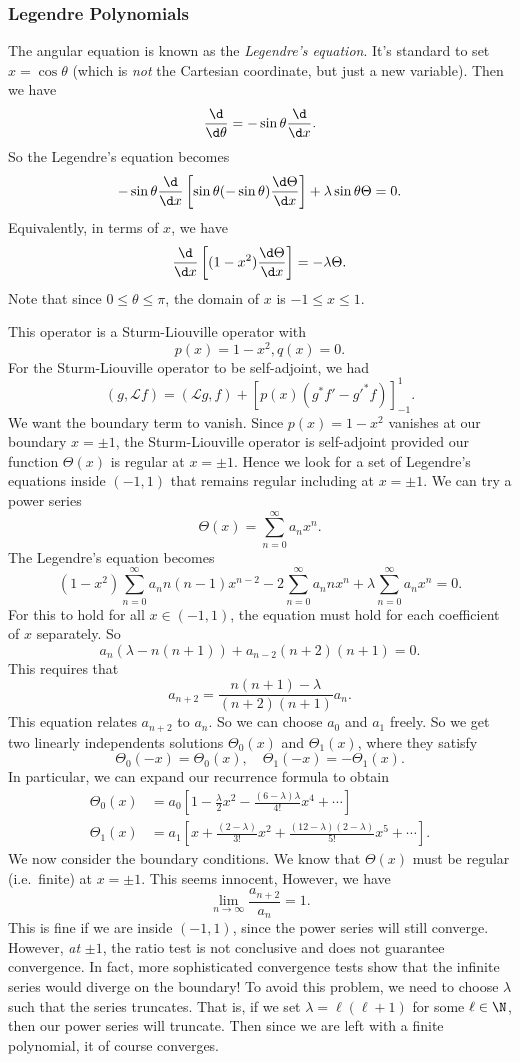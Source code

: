 \documentclass[a4paper]{article}
\begin{document}
\subsubsection{Legendre Polynomials}
The angular equation is known as the \emph{Legendre's equation}. It's standard to set $x = \cos \theta$ (which is \emph{not} the Cartesian coordinate, but just a new variable). Then we have
\[
  \frac{\d}{\d \theta} = -\sin \theta \frac{\d}{\d x}.
\]
So the Legendre's equation becomes
\[
  -\sin \theta \frac{\d}{\d x}\left[\sin \theta (-\sin \theta) \frac{\d \Theta}{\d x}\right]+ \lambda \sin \theta \Theta = 0.
\]
Equivalently, in terms of $x$, we have
\[
  \frac{\d}{\d x}\left[(1 - x^2) \frac{\d \Theta}{\d x}\right] = -\lambda \Theta.
\]
Note that since $0 \leq \theta \leq \pi$, the domain of $x$ is $-1 \leq x \leq 1$.

This operator is a Sturm-Liouville operator with
\[
  p(x) = 1 - x^2, q(x) = 0.
\]
For the Sturm-Liouville operator to be self-adjoint, we had
\[
  (g, \mathcal{L} f) = (\mathcal{L}g, f) + [p(x) (g^* f' - g'^* f)]^{1}_{-1}.
\]
We want the boundary term to vanish. Since $p(x) = 1- x^2$ vanishes at our boundary $x = \pm 1$, the Sturm-Liouville operator is self-adjoint provided our function $\Theta(x)$ is regular at $x = \pm 1$. Hence we look for a set of Legendre's equations inside $(-1, 1)$ that remains regular including at $x = \pm 1$. We can try a power series
\[
  \Theta(x) = \sum_{n = 0}^\infty a_n x^n.
\]
The Legendre's equation becomes
\[
  (1 - x^2) \sum_{n = 0}^\infty a_n n(n - 1)x^{n - 2} - 2\sum_{n = 0}^\infty a_n nx^n + \lambda \sum_{n = 0}^\infty a_n x^n = 0.
\]
For this to hold for all $x\in (-1, 1)$, the equation must hold for each coefficient of $x$ separately. So
\[
  a_n(\lambda - n(n + 1)) + a_{n - 2}(n + 2)(n + 1) = 0.
\]
This requires that
\[
  a_{n + 2} = \frac{n(n + 1) - \lambda}{(n + 2)(n + 1)} a_n.
\]
This equation relates $a_{n + 2}$ to $a_n$. So we can choose $a_0$ and $a_1$ freely. So we get two linearly independents solutions $\Theta_0(x)$ and $\Theta_1(x)$, where they satisfy
\[
  \Theta_0(-x) = \Theta_0(x), \quad \Theta_1(-x) = -\Theta_1(x).
\]
In particular, we can expand our recurrence formula to obtain
\begin{align*}
  \Theta_0(x) &= a_0 \left[1 - \frac{\lambda}{2} x^2 - \frac{(6 - \lambda)\lambda}{4!}x^4 + \cdots\right]\\
  \Theta_1(x) &= a_1 \left[x + \frac{(2 - \lambda)}{3!}x^2 + \frac{(12 - \lambda)(2 - \lambda)}{5!}x^5 + \cdots\right].
\end{align*}
We now consider the boundary conditions. We know that $\Theta(x)$ must be regular (i.e.\ finite) at $x = \pm 1$. This seems innocent, However, we have
\[
  \lim_{n \to \infty}\frac{a_{n + 2}}{a_n} = 1.
\]
This is fine if we are inside $(-1, 1)$, since the power series will still converge. However, \emph{at} $\pm 1$, the ratio test is not conclusive and does not guarantee convergence. In fact, more sophisticated convergence tests show that the infinite series would diverge on the boundary! To avoid this problem, we need to choose $\lambda$ such that the series truncates. That is, if we set $\lambda = \ell(\ell + 1)$ for some $\ell \in \N$, then our power series will truncate. Then since we are left with a finite polynomial, it of course converges.
\end{document}
